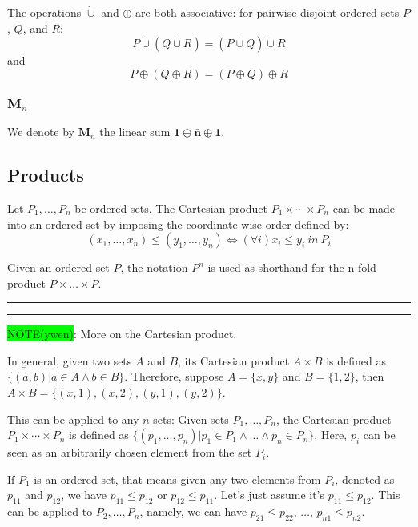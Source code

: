 \documentclass[12pt, letterpaper, oneside]{book}
\begin{document}
The operations $\dot{\cup}$ and $\oplus$ are both associative: for pairwise disjoint ordered sets $P$, $Q$, and $R$:
\[P \dot{\cup} (Q \dot{\cup} R) = (P \dot{\cup} Q) \dot{\cup} R\]
and
\[P \oplus (Q \oplus R) = (P \oplus Q) \oplus R\]

\subsubsection{$\mathbf{M}_n$}

We denote by $\mathbf{M}_n$ the linear sum $\mathbf{1} \oplus \bar{\mathbf{n}} \oplus \mathbf{1}$.

\subsection{Products}

Let $P_1, \ldots, P_n$ be ordered sets. The Cartesian product $P_1 \times \cdots \times P_n$ can be made into an ordered
set by imposing the coordinate-wise order defined by:
\[
  (x_1, \ldots, x_n) \leqslant (y_1, \ldots, y_n) \Leftrightarrow (\forall i) x_i \leqslant y_i \ in \ P_i
\]

Given an ordered set $P$, the notation $P^n$ is used as shorthand for the n-fold product $P \times \ldots \times P$.

\noindent\rule[-9pt]{1cm}{10pt}\rule{10cm}{0.4pt}

\colorbox{lime}{NOTE(ywen)}: More on the Cartesian product.

In general, given two sets $A$ and $B$, its Cartesian product $A \times B$ is defined as $\{(a, b) | a \in A \land b \in B\}$.
Therefore, suppose $A = \{x, y\}$ and $B = \{1, 2\}$, then $A \times B = \{(x, 1), (x, 2), (y, 1), (y, 2)\}$.

This can be applied to any $n$ sets: Given sets $P_1, \ldots, P_n$, the Cartesian product $P_1 \times \cdots \times P_n$
is defined as $\{(p_1, \ldots, p_n) | p_1 \in P_1 \land \ldots \land p_n \in P_n\}$. Here, $p_i$ can be seen as an
arbitrarily chosen element from the set $P_i$.

If $P_1$ is an ordered set, that means given any two elements from $P_i$, denoted as $p_{11}$ and $p_{12}$, we have
$p_{11} \leqslant p_{12}$ or $p_{12} \leqslant p_{11}$. Let's just assume it's $p_{11} \leqslant p_{12}$. This can be
applied to $P_2, \ldots, P_n$, namely, we can have $p_{21} \leqslant p_{22}$, $\ldots$, $p_{n1} \leqslant p_{n2}$.
\end{document}
